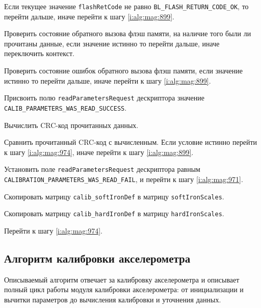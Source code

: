 \begin{enumerate_step}
    \item Если текущее значение \lstinline|flashRetCode| не равно \lstinline|BL_FLASH_RETURN_CODE_OK|, то перейти дальше, иначе перейти к шагу
    \ref{i:alg:mag:899}.
    \item Проверить состояние обратного вызова флэш памяти, на наличие того были ли прочитаны данные, если значение истинно то перейти дальше, иначе переключить контекст.
    \item Проверить состояние ошибок обратного вызова флэш памяти, если значение истинно то перейти дальше, иначе перейти к шагу \ref{i:alg:mag:899}.
    \item Присвоить полю \lstinline|readParametersRequest| дескриптора значение \lstinline|CALIB_PARAMETERS_WAS_READ_SUCCESS|.
    \item Вычислить CRC-код прочитанных данных.
    \item Сравнить прочитанный CRC-код с вычисленным. Если условие истинно перейти к шагу \ref{i:alg:mag:974}, иначе перейти к шагу \ref{i:alg:mag:899}.
    \item \label{i:alg:mag:899} Установить поле \lstinline|readParametersRequest| дескриптора равным \lstinline|CALIBRATION_PARAMETERS_WAS_READ_FAIL|, и перейти к шагу \ref{i:alg:mag:971}.
    \item \label{i:alg:mag:971} Скопировать матрицу \lstinline|calib_softIronDef| в матрицу \lstinline|softIronScales|.
    \item Скопировать матрицу \lstinline|calib_hardIronDef| в матрицу \lstinline|hardIronScales|.
    \item Перейти к шагу \ref{i:alg:mag:974}.
\end{enumerate_step}

\subsection{Алгоритм калибровки акселерометра}

Описываемый алгоритм отвечает за калибровку акселерометра и описывает полный цикл работы модуля калибровки акселерометра: от инициализации и вычитки параметров до
вычисления калибровки и уточнения данных. 

